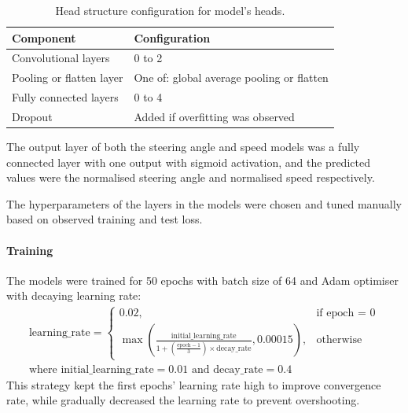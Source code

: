 \documentclass{article}
\begin{document}
\begin{table}[H]
  \centering
  \renewcommand{\arraystretch}{1.2}
  \begin{tabular}{|l|l|}
    \hline
    \textbf{Component}       & \textbf{Configuration}                    \\
    \hline
    Convolutional layers     & 0 to 2                                    \\
    Pooling or flatten layer & One of: global average pooling or flatten \\
    Fully connected layers   & 0 to 4                                    \\
    Dropout                  & Added if overfitting was observed         \\
    \hline
  \end{tabular}
  \vspace{0.5em}
  \caption{Head structure configuration for model's heads.}
  \label{tab:head_structure}
\end{table}

The output layer of both the steering angle and speed models was a fully connected layer with one output with sigmoid activation, and the predicted values were the normalised steering angle and normalised speed respectively.

The hyperparameters of the layers in the models were chosen and tuned manually based on observed training and test loss.

\paragraph{Training}

The models were trained for 50 epochs with batch size of 64 and Adam optimiser with decaying learning rate:
\begin{equation}
  \begin{aligned}
    \text{learning\_rate} =
    \begin{cases}
      0.02,                                                                                                                                   & \text{if epoch = 0}
      \\
      \max\left(\frac{\text{initial\_learning\_rate}}{1 + \left(\frac{\text{epoch} - 1}{3}\right) \times \text{decay\_rate}}, 0.00015\right), & \text{otherwise}
    \end{cases}
    \\
    \text{where } \text{initial\_learning\_rate} = 0.01 \text{ and } \text{decay\_rate} = 0.4
  \end{aligned}
  \label{eq:learning_rate}
\end{equation}
This strategy kept the first epochs' learning rate high to improve convergence rate, while gradually decreased the learning rate to prevent overshooting.
\end{document}
